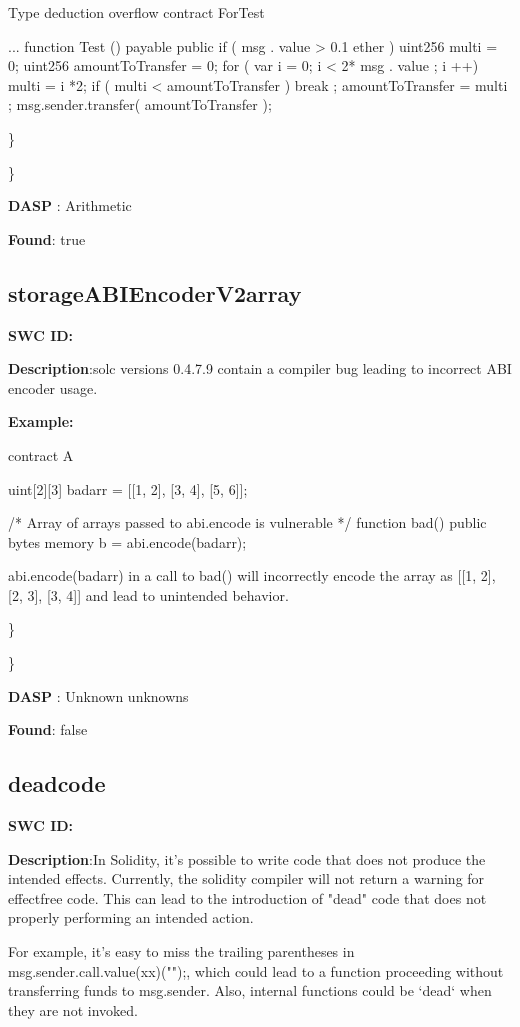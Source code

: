 \documentclass{article}
\begin{document}
Type deduction overflow
contract For\textunderscore Test {
...
  function Test () payable public {
    if ( msg . value > 0.1 ether ) {
      uint256 multi = 0;
      uint256 amountToTransfer = 0;
      for ( var i = 0; i < 2* msg . value ; i ++) {
        multi = i *2;
        if ( multi < amountToTransfer ) {
          break ;
        amountToTransfer = multi ;
      }
      msg.sender.transfer( amountToTransfer );
    }
  }
}

\} 

\} 

\textbf{DASP} : Arithmetic

\textbf{Found}: true

\subsection{storage\textunderscore ABIEncoderV2\textunderscore array} 
\textbf{SWC \textunderscore ID:} 

\textbf{Description}:solc versions 0.4.7.9 contain a compiler bug leading to incorrect ABI encoder usage.


\textbf{Example:} 

contract A {
    uint[2][3] bad\textunderscore arr = [[1, 2], [3, 4], [5, 6]];

    /* Array of arrays passed to abi.encode is vulnerable */
    function bad() public {
        bytes memory b = abi.encode(bad\textunderscore arr);
    }
}

abi.encode(bad\textunderscore arr) in a call to bad() will incorrectly encode the array as [[1, 2], [2, 3], [3, 4]] and lead to unintended behavior.

\} 

\} 

\textbf{DASP} : Unknown unknowns

\textbf{Found}: false

\subsection{dead\textunderscore code} 
\textbf{SWC \textunderscore ID:} 

\textbf{Description}:In Solidity, it's possible to write code that does not produce the intended effects. Currently, the solidity compiler will not return a warning for effect\textendash free code. This can lead to the introduction of "dead" code that does not properly performing an intended action.

For example, it's easy to miss the trailing parentheses in msg.sender.call.value(xx)("");, which could lead to a function proceeding without transferring funds to msg.sender. Also, internal functions could be `dead` when they are not invoked.


}
\end{document}
